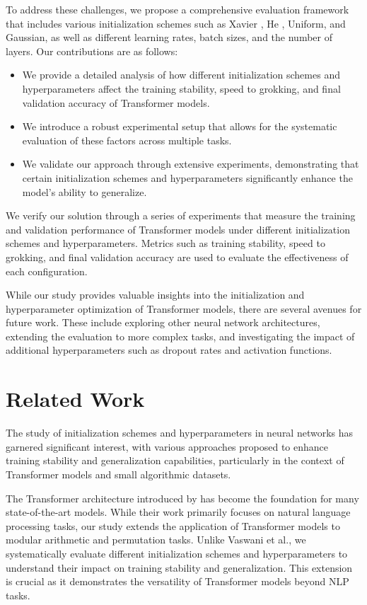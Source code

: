 \documentclass{article} %
\begin{document}
To address these challenges, we propose a comprehensive evaluation framework that includes various initialization schemes such as Xavier \citep{Glorot2010UnderstandingTD}, He \citep{He2015DelvingDI}, Uniform, and Gaussian, as well as different learning rates, batch sizes, and the number of layers. Our contributions are as follows:
\begin{itemize}
    \item We provide a detailed analysis of how different initialization schemes and hyperparameters affect the training stability, speed to grokking, and final validation accuracy of Transformer models.
    \item We introduce a robust experimental setup that allows for the systematic evaluation of these factors across multiple tasks.
    \item We validate our approach through extensive experiments, demonstrating that certain initialization schemes and hyperparameters significantly enhance the model's ability to generalize.
\end{itemize}

We verify our solution through a series of experiments that measure the training and validation performance of Transformer models under different initialization schemes and hyperparameters. Metrics such as training stability, speed to grokking, and final validation accuracy are used to evaluate the effectiveness of each configuration.

While our study provides valuable insights into the initialization and hyperparameter optimization of Transformer models, there are several avenues for future work. These include exploring other neural network architectures, extending the evaluation to more complex tasks, and investigating the impact of additional hyperparameters such as dropout rates and activation functions.

\section{Related Work}
\label{sec:related}

The study of initialization schemes and hyperparameters in neural networks has garnered significant interest, with various approaches proposed to enhance training stability and generalization capabilities, particularly in the context of Transformer models and small algorithmic datasets.

The Transformer architecture introduced by \citet{vaswani2017attention} has become the foundation for many state-of-the-art models. While their work primarily focuses on natural language processing tasks, our study extends the application of Transformer models to modular arithmetic and permutation tasks. Unlike Vaswani et al., we systematically evaluate different initialization schemes and hyperparameters to understand their impact on training stability and generalization. This extension is crucial as it demonstrates the versatility of Transformer models beyond NLP tasks.
\end{document}

